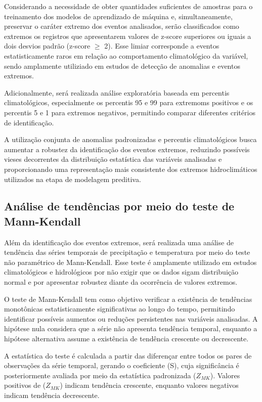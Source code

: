 	Considerando a necessidade de obter quantidades suficientes de amostras para o treinamento dos modelos de aprendizado de máquina e, simultaneamente, preservar o caráter extremo dos eventos analisados, serão classificados como extremos os registros que apresentarem valores de z-score superiores ou iguais a dois desvios padrão (z-score $\geq$ 2).
	Esse limiar corresponde a eventos estatisticamente raros em relação ao comportamento climatológico da variável, sendo amplamente utiliziado em estudos de detecção de anomalias e eventos extremos.

	Adicionalmente, será realizada análise exploratória baseada em percentis climatológicos, especialmente os percentis 95 e 99 para extremoms positivos e os percentis 5 e 1 para extremos negativos, permitindo comparar diferentes critérios de identificação.

	A utilização conjunta de anomalias padronizadas e percentis climatológicos busca aumentar a robustez da identificação dos eventos extremos, reduzindo possíveis vieses decorrentes da distribuição estatística das variáveis analisadas e proporcionando uma representação mais consistente dos extremos hidroclimáticos utilizados na etapa de modelagem preditiva.


\subsection{Análise de tendências por meio do teste de Mann-Kendall}\label{sec:mann-kendall}

	Além da identificação dos eventos extremos, será realizada uma análise de tendência das séries temporais de precipitação e temperatura por meio do teste não paramétrico de Mann-Kendall.
	Esse teste é amplamente utilizado em estudos climatológicos e hidrológicos por não exigir que os dados sigam distribuição normal e por apresentar robustez diante da ocorrência de valores extremos.

	O teste de Mann-Kendall tem como objetivo verificar a existência de tendências monotônicas estatisticamente significativas ao longo do tempo, permitindo identificar possíveis aumentos ou reduções persistentes nas variáveis analisadas.
	A hipótese nula considera que a série não apresenta tendência temporal, enquanto a hipótese alternativa assume a existência de tendência crescente ou decrescente.

	A estatística do teste é calculada a partir das diferençar entre todos os pares de observações da série temporal, gerando o coeficiente (S), cuja significância é posteriormente avaliada por meio da estatística padronizada ($Z_{MK}$).
	Valores positivos de ($Z_{MK}$) indicam tendência crescente, enquanto valores negativos indicam tendência decrescente.

